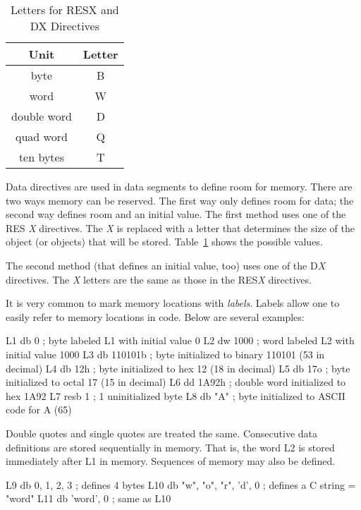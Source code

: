 \begin{table}[t]
\centering
\begin{tabular}{||c|c||} \hline
{\bf Unit} & {\bf Letter} \\
\hline
byte & B \\
word & W \\
double word & D \\
quad word & Q \\
ten bytes & T \\
\hline
\end{tabular}
\caption{Letters for {\code RESX} and {\code DX} Directives 
         \label{tab:size-letters} }
\end{table}

Data directives are used in data segments to define room for
memory. There are two ways memory can be reserved. The first way only
defines room for data; the second way defines room and an initial
value. The first method uses one of the {\code RES{\em
X}} directives. The {\em X} is replaced
with a letter that determines the size of the object (or objects) that
will be stored. Table~\ref{tab:size-letters} shows the possible
values.

The second method (that defines an initial value, too) uses one of the
{\code D{\em X}} directives. The {\em X}
letters are the same as those in the {\code RES{\em X}} directives.

It is very common to mark memory locations with
\emph{labels}.  Labels allow one to easily refer to
memory locations in code. Below are several examples:
\begin{AsmCodeListing}[frame=none, numbers=none]
L1    db     0        ; byte labeled L1 with initial value 0
L2    dw     1000     ; word labeled L2 with initial value 1000
L3    db     110101b  ; byte initialized to binary 110101 (53 in decimal)
L4    db     12h      ; byte initialized to hex 12 (18 in decimal)
L5    db     17o      ; byte initialized to octal 17 (15 in decimal)
L6    dd     1A92h    ; double word initialized to hex 1A92
L7    resb   1        ; 1 uninitialized byte
L8    db     "A"      ; byte initialized to ASCII code for A (65)
\end{AsmCodeListing}

Double quotes and single quotes are treated the same. Consecutive data
definitions are stored sequentially in memory. That is, the word L2 is
stored immediately after L1 in memory. Sequences of memory may also be
defined.
\begin{AsmCodeListing}[frame=none, numbers=none]
L9    db     0, 1, 2, 3              ; defines 4 bytes
L10   db     "w", "o", "r", 'd', 0   ; defines a C string = "word"
L11   db     'word', 0               ; same as L10
\end{AsmCodeListing}

